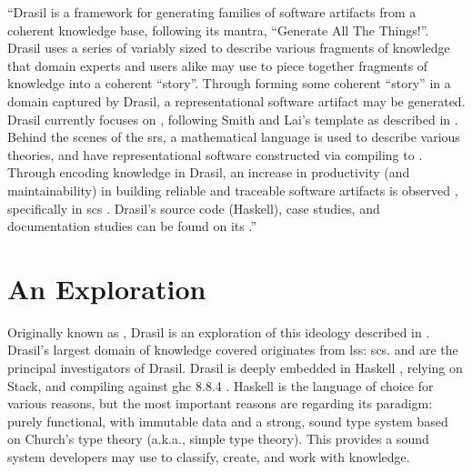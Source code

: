 
\begin{mdleftbar}
      ``Drasil is a framework for generating families of software artifacts from
      a coherent knowledge base, following its mantra, ``Generate All The
      Things!''. Drasil uses a series of variably sized  to describe
      various fragments of knowledge that domain experts and users alike may use
      to piece together fragments of knowledge into a coherent ``story''.
      Through forming some coherent ``story'' in a domain captured by Drasil, a
      representational software artifact may be generated. Drasil currently
      focuses on , following Smith and Lai's  template as
      described in \cite{SmithAndLai2005}. Behind the scenes of the \acs{srs}, a
      mathematical language is used to describe various theories, and have
      representational software constructed via compiling to 
      \cite{Carette2019}. Through encoding knowledge in Drasil, an increase in
      productivity (and maintainability) in building reliable and traceable
      software artifacts is observed \cite{SzymczakEtAl2016}, specifically in
      \acs{scs} \cite{Smith2018}. Drasil's source code (Haskell), case studies,
      and documentation studies can be found on its
      .''
      \cite{Balaci2021Poster}
\end{mdleftbar}

\section{An Exploration}

Originally known as , Drasil is an exploration of this
ideology described in . Drasil's largest domain of knowledge
covered originates from \acs{lss}: \acl{scs}.  and  are the principal investigators of
Drasil. Drasil is deeply embedded in Haskell \cite{Haskell2010}, relying on
Stack, and compiling against \acs{ghc} 8.8.4 \cite{GHC884}.
Haskell is the language of choice for various reasons, but the most important
reasons are regarding its paradigm: purely functional, with immutable data and a
strong, sound type system based on Church's type theory (a.k.a., simple type
theory). This provides a sound system developers may use to
classify, create, and work with knowledge.

